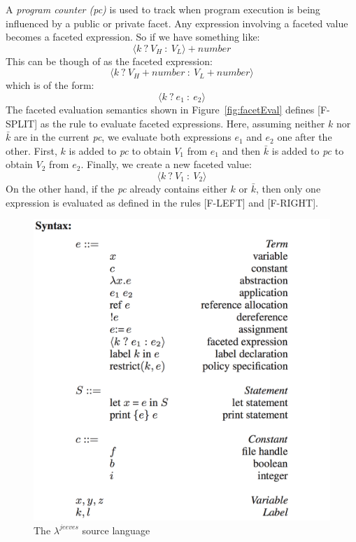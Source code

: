 A \textit{program counter (pc)} is used to track when program execution is being
influenced by a public or private facet. Any expression involving a faceted value
becomes a faceted expression. So if we have something like:
\[\langle k~?~V_H~:~V_L \rangle + number \]
This can be though of as the faceted expression:
\[\langle k~?~V_H + number~:~V_L + number \rangle\]
which is of the form:
\[\langle k~?~e_1~:~e_2 \rangle\]
The faceted evaluation semantics shown in Figure~\ref{fig:facetEval} defines [F-SPLIT]
as the rule to evaluate faceted expressions. Here, assuming neither $k$ nor $\bar{k}$
are in the current \textit{pc}, we evaluate both expressions $e_1$ and $e_2$
one after the other. First, $k$ is added to \textit{pc} to obtain $V_1$ from $e_1$
and then $\bar{k}$ is added to \textit{pc} to obtain $V_2$ from $e_2$. Finally,
we create a new faceted value:
\[\langle k~?~V_1~:~V_2 \rangle\]
On the other hand, if the \textit{pc} already contains either $k$ or $\bar{k}$,
then only one expression is evaluated as defined in the rules [F-LEFT] and [F-RIGHT].

\begin{figure}
	\centering
	\includegraphics[scale=0.25, frame]{images/lambdaJeeves.png}
	\caption{The $\lambda^{jeeves}$ source language~\cite{FacetedJeeves}}
	\label{fig:lambdaJeeves}
\end{figure}

